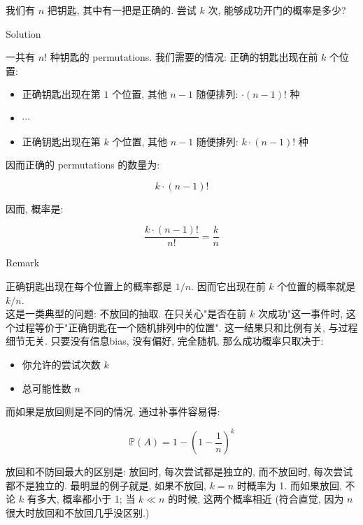 \documentclass{qlnotes-export}
\begin{document}
\begin{example}\label{ex-01-combinatorics-prob-space-example-003}

我们有 \(n\) 把钥匙, 其中有一把是正确的. 尝试 \(k\) 次, 能够成功开门的概率是多少?

\end{example}

\begin{qlsolution}{Solution}

一共有 \(n!\) 种钥匙的 permutations. 我们需要的情况: 正确的钥匙出现在前 \(k\) 个位置:

\begin{itemize}
\item
  正确钥匙出现在第 \(1\) 个位置, 其他 \(n - 1\) 随便排列: \(\cdot (n - 1)!\) 种
\item
  \(\cdots\)
\item
  正确钥匙出现在第 \(k\) 个位置, 其他 \(n - 1\) 随便排列: \(k \cdot (n - 1)!\) 种
\end{itemize}

因而正确的 permutations 的数量为:

\[k \cdot (n - 1)!\]

因而, 概率是:

\[\frac{k \cdot (n - 1)!}{n!} = \frac{k}{n}\]

\end{qlsolution}

\begin{qlremark}{Remark}

正确钥匙出现在每个位置上的概率都是 \(1/n\). 因而它出现在前 \(k\) 个位置的概率就是 \(k/n\).\\
这是一类典型的问题: 不放回的抽取. 在只关心"是否在前 \(k\) 次成功"这一事件时, 这个过程等价于"正确钥匙在一个随机排列中的位置". 这一结果只和比例有关, 与过程细节无关. 只要没有信息bias, 没有偏好, 完全随机, 那么成功概率只取决于:

\begin{itemize}
\item
  你允许的尝试次数 \(k\)
\item
  总可能性数 \(n\)
\end{itemize}

而如果是放回则是不同的情况. 通过补事件容易得:

\[{\mathbb{P}}(A) = 1 - \left( {1 - \frac{1}{n}} \right)^{k}\]

放回和不防回最大的区别是: 放回时, 每次尝试都是独立的, 而不放回时, 每次尝试都不是独立的. 最明显的例子就是, 如果不放回, \(k = n\) 时概率为 1. 而如果放回, 不论 \(k\) 有多大, 概率都小于 1; 当 \(k \ll n\) 的时候, 这两个概率相近 (符合直觉, 因为 \(n\) 很大时放回和不放回几乎没区别.)

\end{qlremark}
\end{document}
